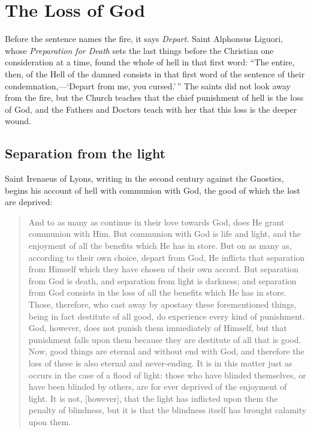 \section{The Loss of God}

Before the sentence names the fire, it says \emph{Depart}. Saint Alphonsus Liguori, whose \emph{Preparation for Death} sets the last things before the Christian one consideration at a time, found the whole of hell in that first word: ``The entire, then, of the Hell of the damned consists in that first word of the sentence of their condemnation,---`Depart from me, you cursed.'\,'' The saints did not look away from the fire, but the Church teaches that the chief punishment of hell is the loss of God, and the Fathers and Doctors teach with her that this loss is the deeper wound.

\subsection{Separation from the light}

Saint Irenaeus of Lyons, writing in the second century against the Gnostics, begins his account of hell with communion with God, the good of which the lost are deprived:

\begin{quote}
And to as many as continue in their love towards God, does He grant communion with Him. But communion with God is life and light, and the enjoyment of all the benefits which He has in store. But on as many as, according to their own choice, depart from God, He inflicts that separation from Himself which they have chosen of their own accord. But separation from God is death, and separation from light is darkness; and separation from God consists in the loss of all the benefits which He has in store. Those, therefore, who cast away by apostasy these forementioned things, being in fact destitute of all good, do experience every kind of punishment. God, however, does not punish them immediately of Himself, but that punishment falls upon them because they are destitute of all that is good. Now, good things are eternal and without end with God, and therefore the loss of these is also eternal and never-ending. It is in this matter just as occurs in the case of a flood of light: those who have blinded themselves, or have been blinded by others, are for ever deprived of the enjoyment of light. It is not, [however], that the light has inflicted upon them the penalty of blindness, but it is that the blindness itself has brought calamity upon them.
\end{quote}

